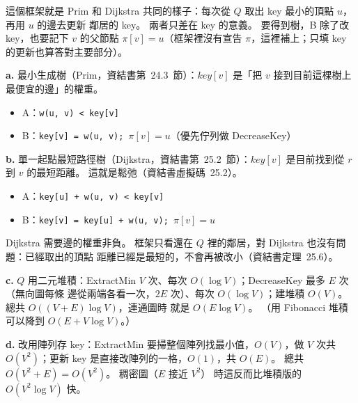 \begin{pastsoln}
這個框架就是 Prim 和 Dijkstra 共同的樣子：每次從 $Q$ 取出 key 最小的頂點 $u$，再用 $u$ 的邊去更新
鄰居的 key。 兩者只差在 key 的意義。 要得到樹，B 除了改 key，也要記下 $v$ 的父節點
$\pi[v] = u$（框架裡沒有宣告 $\pi$，這裡補上；只填 key 的更新也算答對主要部分）。

\textbf{a.} 最小生成樹（Prim，資結書第~24.3~節）：$\mathit{key}[v]$ 是「把 $v$ 接到目前這棵樹上
最便宜的邊」的權重。
\begin{itemize}
\item A：\texttt{w(u, v) < key[v]}
\item B：\texttt{key[v] = w(u, v); }$\pi[v] = u$（優先佇列做 DecreaseKey）
\end{itemize}

\textbf{b.} 單一起點最短路徑樹（Dijkstra，資結書第~25.2~節）：$\mathit{key}[v]$ 是目前找到從 $r$ 到
$v$ 的最短距離。 這就是鬆弛（資結書虛擬碼~25.2）。
\begin{itemize}
\item A：\texttt{key[u] + w(u, v) < key[v]}
\item B：\texttt{key[v] = key[u] + w(u, v); }$\pi[v] = u$
\end{itemize}
Dijkstra 需要邊的權重非負。 框架只看還在 $Q$ 裡的鄰居，對 Dijkstra 也沒有問題：已經取出的頂點
距離已經是最短的，不會再被改小（資結書定理~25.6）。

\textbf{c.} $Q$ 用二元堆積：ExtractMin $V$ 次、每次 $O(\log V)$；DecreaseKey 最多 $E$ 次（無向圖每條
邊從兩端各看一次，$2E$ 次）、每次 $O(\log V)$；建堆積 $O(V)$。 總共 $O((V + E) \log V)$，連通圖時
就是 $O(E \log V)$。 （用 Fibonacci 堆積可以降到 $O(E + V \log V)$。）

\textbf{d.} 改用陣列存 key：ExtractMin 要掃整個陣列找最小值，$O(V)$，做 $V$ 次共 $O(V^2)$；更新
key 是直接改陣列的一格，$O(1)$，共 $O(E)$。 總共 $O(V^2 + E) = O(V^2)$。 稠密圖（$E$ 接近 $V^2$）
時這反而比堆積版的 $O(V^2 \log V)$ 快。
\end{pastsoln}
